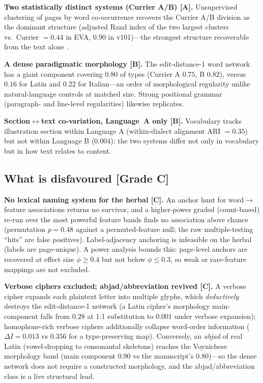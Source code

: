 \documentclass[11pt]{article}
\newcommand{\grade}[1]{{\small\textbf{[#1]}}}
\begin{document}
\textbf{Two statistically distinct systems (Currier A/B) \grade{A}.} Unsupervised
clustering of pages by word co-occurrence recovers the Currier A/B division as the
dominant structure (adjusted Rand index of the two largest clusters vs.\ Currier
$=0.44$ in EVA, $0.90$ in v101)---the strongest structure recoverable from the text
alone \citep{montemurro2013keywords}.

\textbf{A dense paradigmatic morphology \grade{B}.} The edit-distance-1 word network
has a giant component covering $0.80$ of types (Currier A $0.75$, B $0.82$), versus
$0.16$ for Latin and $0.22$ for Italian---an order of morphological regularity unlike
natural-language controls at matched size. Strong positional grammar (paragraph- and
line-level regularities) likewise replicates.

\textbf{Section$\leftrightarrow$text co-variation, Language~A only \grade{B}.}
Vocabulary tracks illustration section within Language A (within-dialect alignment ARI
$=0.35$) but not within Language B ($0.004$): the two systems differ not only in
vocabulary but in how text relates to content.

\subsection{What is disfavoured \grade{Grade C}}
\textbf{No lexical naming system for the herbal \grade{C}.} An anchor hunt for
word$\rightarrow$feature associations returns no survivor, and a higher-power graded
(count-based) re-run over the most powerful feature bands finds no association above
chance (permutation $p=0.48$ against a permuted-feature null; the raw multiple-testing
``hits'' are false positives). Label-adjacency anchoring is infeasible on the herbal
(labels are page-unique). A power analysis bounds this: page-level anchors are
recovered at effect size $\phi\geq 0.4$ but not below $\phi\leq 0.3$, so weak or
rare-feature mappings are not excluded.

\textbf{Verbose ciphers excluded; abjad/abbreviation revived \grade{C}.} A verbose
cipher expands each plaintext letter into multiple glyphs, which \emph{deductively}
destroys the edit-distance-1 network (a Latin cipher's morphology main-component falls
from $0.28$ at 1:1 substitution to $0.001$ under verbose expansion); homophone-rich
verbose ciphers additionally collapse word-order information ($\Delta I = 0.013$ vs
$0.356$ for a type-preserving map). Conversely, an \emph{abjad} of real Latin
(vowel-dropping to consonantal skeletons) reaches the Voynichese morphology band
(main component $0.90$ vs the manuscript's $0.80$)---so the dense network does not
require a constructed morphology, and the abjad/abbreviation class
\citep{hauer2016decoding} is a live structural lead.
\end{document}
